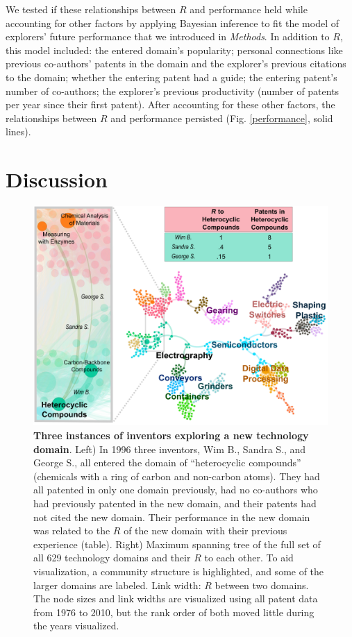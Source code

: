 \documentclass{dsj}
\begin{document}
We tested if these relationships between $R$ and performance held while accounting for other factors by applying Bayesian inference to fit the model of explorers' future performance that we introduced in \textit{Methods}. In addition to $R$, this model included: the entered domain's popularity; personal connections like previous co-authors' patents in the domain and the explorer's previous citations to the domain; whether the entering patent had a guide; the entering patent's number of co-authors; the explorer's previous productivity (number of patents per year since their first patent). After accounting for these other factors, the relationships between $R$ and performance persisted (Fig. \ref{performance}, solid lines).




\section*{Discussion}

\begin{figure}
\includegraphics[width=1.3\columnwidth]{figs/Case_Study_patents.png} 
\caption{\textbf{Three instances of inventors exploring a new technology domain}. Left) In 1996 three inventors, Wim B., Sandra S., and George S., all entered the domain of ``heterocyclic compounds'' (chemicals with a ring of carbon and non-carbon atoms). They had all patented in only one domain previously, had no co-authors who had previously patented in the new domain, and their patents had not cited the new domain. Their performance in the new domain was related to the $R$ of the new domain with their previous experience (table). Right) Maximum spanning tree of the full set of all 629 technology domains and their $R$ to each other. To aid visualization, a community structure is highlighted, and some of the larger domains are labeled.
Link width: $R$ between two domains.
The node sizes and link widths are visualized using all patent data from 1976 to 2010, but the rank order of both moved little during the years visualized.
}\label{movement_case}
\end{figure}
\end{document}
